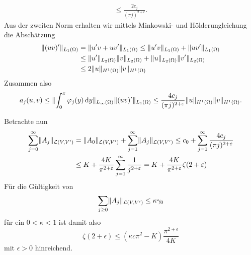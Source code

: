 \begin{Satz}
\begin{Beweis}
\begin{equation}
\begin{aligned}
                \leq \frac{2 c_{j}}{(\pi j)^{2+\epsilon}}.
            \end{aligned}
        \end{equation}
        Aus der zweiten Norm erhalten wir mittels Minkowski- und Hölderungleichung die Abschätzung
        \begin{equation}
            \begin{aligned}
                \lVert(uv)'\rVert_{L_{1}(\Omega)}
                &= \lVert u'v + uv'\rVert_{L_{1}(\Omega)}
                \leq \lVert u'v\rVert_{L_{1}(\Omega)} + \lVert uv'\rVert_{L_{1}(\Omega)}
                \\&\leq \lVert u'\rVert_{L_{2}(\Omega)} \lVert v\rVert_{L_{2}(\Omega)} + \lVert u\rVert_{L_{2}(\Omega)} \lVert v'\rVert_{L_{2}(\Omega)}
                \\&\leq 2 \lVert u\rVert_{H^{1}(\Omega)} \lVert v\rVert_{H^{1}(\Omega)}
            \end{aligned}
        \end{equation}
        Zusammen also
        \begin{equation}
            a_{j}(u, v)
            \leq \lVert\int_{0}^{x} \varphi_{j}(y) \mathop{}\!\mathrm{d} y \rVert_{L_{\infty}(\Omega)} \lVert(uv)'\rVert_{L_{1}(\Omega)}
            \leq \frac{4 c_{j}}{(\pi j)^{2 + \varepsilon}} \lVert u\rVert_{H^{1}(\Omega)} \lVert v\rVert_{H^{1}(\Omega)}.
        \end{equation}

        Betrachte nun
        \begin{align}
                    \sum_{j = 0}^{\infty} \lVert A_{j}\rVert_{\mathcal L(V, V')}
            &= \lVert A_{0}\rVert_{\mathcal L(V, V')} + \sum_{j = 1}^{\infty} \lVert A_{j}\rVert_{\mathcal L(V, V')}
            \leq c_{0} + \sum_{j = 1}^{\infty} \frac{4 c_{j}}{(\pi j)^{2 + \varepsilon}}
            \\&\leq K + \frac{4 K}{\pi^{2 + \varepsilon}} \sum_{j = 1}^{\infty} \frac{1}{j^{2 + \varepsilon}}
            = K + \frac{4 K}{\pi^{2 + \varepsilon}} \zeta(2 + \varepsilon)
        \end{align}
        Für die Gültigkeit von
        \begin{equation}
            \sum_{j \geq 0} \lVert A_{j}\rVert_{\mathcal L(V, V')} \leq \kappa \gamma_{0}
        \end{equation}
        für ein $0 < \kappa < 1$ ist damit also
        \begin{equation}
            \zeta(2 + \epsilon) \leq (\kappa c \pi^{2} - K) \frac{\pi^{2+\epsilon}}{4K}
        \end{equation}
        mit $\epsilon > 0$ hinreichend.
    \end{Beweis}
\end{Satz}

